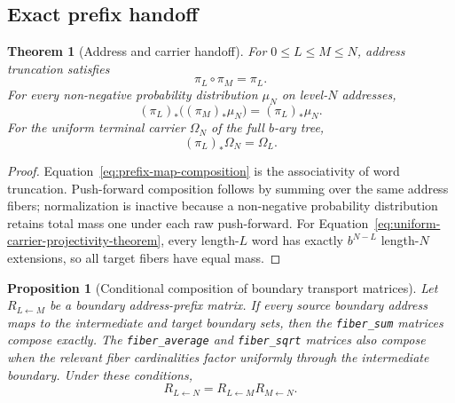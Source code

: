 \documentclass[11pt]{article}
\newtheorem{theorem}[definition]{Theorem}
\newtheorem{proposition}[definition]{Proposition}
\theoremstyle{remark}
\newcommand{\code}[1]{\texttt{#1}}
\numberwithin{equation}{section}
\begin{document}
\subsection{Exact prefix handoff}
\begin{theorem}[Address and carrier handoff]\label{thm:prefix-carrier-handoff}
For \(0\le L\le M\le N\), address truncation satisfies
\begin{equation}
  \pi_L\circ\pi_M=\pi_L.
  \label{eq:prefix-map-composition}
\end{equation}
For every non-negative probability distribution \(\mu_N\) on level-\(N\) addresses,
\begin{equation}
  (\pi_L)_*\bigl((\pi_M)_*\mu_N\bigr)=(\pi_L)_*\mu_N.
  \label{eq:probability-pushforward-composition}
\end{equation}
For the uniform terminal carrier \(\Omega_N\) of the full \(b\)-ary tree,
\begin{equation}
  (\pi_L)_*\Omega_N=\Omega_L.
  \label{eq:uniform-carrier-projectivity-theorem}
\end{equation}
\end{theorem}

\begin{proof}
Equation~\eqref{eq:prefix-map-composition} is the associativity of word truncation. Push-forward composition follows by summing over the same address fibers; normalization is inactive because a non-negative probability distribution retains total mass one under each raw push-forward. For Equation~\eqref{eq:uniform-carrier-projectivity-theorem}, every length-\(L\) word has exactly \(b^{N-L}\) length-\(N\) extensions, so all target fibers have equal mass.
\end{proof}

\begin{proposition}[Conditional composition of boundary transport matrices]\label{prop:boundary-transport-composition}
Let \(R_{L\leftarrow M}\) be a boundary address-prefix matrix. If every source boundary address maps to the intermediate and target boundary sets, then the \code{fiber\_sum} matrices compose exactly. The \code{fiber\_average} and \code{fiber\_sqrt} matrices also compose when the relevant fiber cardinalities factor uniformly through the intermediate boundary. Under these conditions,
\begin{equation}
  R_{L\leftarrow N}=R_{L\leftarrow M}R_{M\leftarrow N}.
  \label{eq:boundary-transport-matrix-composition}
\end{equation}
\end{proposition}
\end{document}
